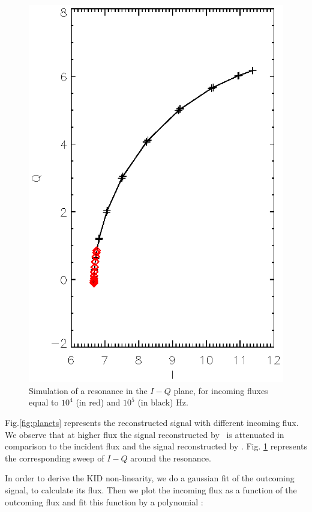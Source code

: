 \begin{figure}[h]
\center
\includegraphics[scale=0.8]{Figures/resonance.eps}
\caption{Simulation of a resonance in the $I-Q$ plane, for incoming fluxes equal to $10^{4}$ (in red) and $10^{5}$ (in black) Hz.}
\label{fig:resonance}
\end{figure}

Fig.\ref{fig:planets} represents the reconstructed signal with different incoming flux. 
We observe that at higher flux the signal reconstructed by \rf\ is attenuated in comparison to the incident flux and the signal reconstructed by \cf . Fig. \ref{fig:resonance} represents the corresponding sweep of $I-Q$ around the resonance.

In order to derive the KID non-linearity, we do a gaussian fit of the outcoming signal, to calculate its flux. Then we plot the incoming flux as a function of the outcoming flux and fit this function by a polynomial :

